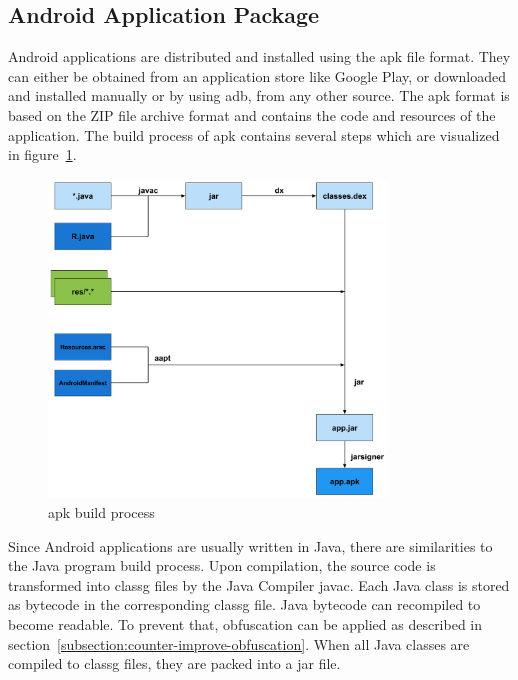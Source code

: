 \subsection{Android Application Package} \label{subsection:foundation-android-package}
Android applications are distributed and installed using the \gls{apk} file format.
They can either be obtained from an application store like Google Play, or downloaded and installed manually or by using \gls{adb}, from any other source.
The \gls{apk} format is based on the ZIP file archive format and contains the code and resources of the application.
\newline
The build process of \gls{apk} contains several steps which are visualized in figure~\ref{fig:apk}.
\newline
\begin{figure}[h]
    \centering
    \includegraphics[width=0.8\textwidth]{data/apk.png}
    \caption{\gls{apk} build process \cite{andevconDalvikART}}
    \label{fig:apk}
\end{figure}
Since Android applications are usually written in Java, there are similarities to the Java program build process.
Upon compilation, the source code is transformed into \gls{classg} files by the Java Compiler javac.
Each Java class is stored as bytecode in the corresponding \gls{classg} file.
Java bytecode can recompiled to become readable.
To prevent that, obfuscation can be applied as described in section~\ref{subsection:counter-improve-obfuscation}.
When all Java classes are compiled to \gls{classg} files, they are packed into a \gls{jar} file.
\newline
